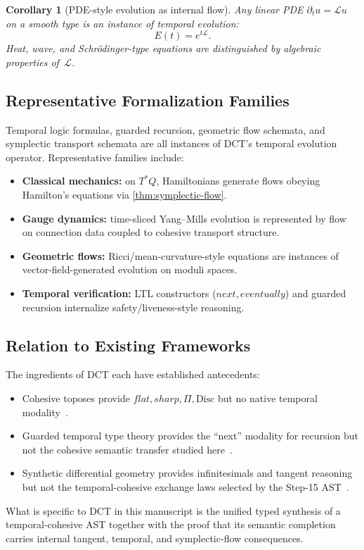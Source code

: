 \documentclass[11pt,a4paper]{article}
\def\flat{flat}%
\def\sharp{sharp}%
\def\bigcirc{next}%
\def\Diamond{eventually}%
\theoremstyle{plain}
\newtheorem{corollary}[theorem]{Corollary}
\theoremstyle{definition}
\theoremstyle{remark}
\newcommand{\Disc}{\mathrm{Disc}}
\begin{document}
\begin{corollary}[PDE-style evolution as internal flow]
Any linear PDE $\partial_t u = \mathcal{L}u$ on a smooth type is an instance of temporal evolution:
\[
E(t) = e^{t\mathcal{L}}.
\]
Heat, wave, and Schr\"odinger-type equations are distinguished by algebraic properties of~$\mathcal{L}$.
\end{corollary}

\subsection{Representative Formalization Families}

Temporal logic formulas, guarded recursion, geometric flow schemata, and symplectic transport schemata are all instances of DCT's temporal evolution operator.
Representative families include:
\begin{itemize}[nosep]
    \item \textbf{Classical mechanics:} on $T^*Q$, Hamiltonians generate flows obeying Hamilton's equations via \cref{thm:symplectic-flow}.
    \item \textbf{Gauge dynamics:} time-sliced Yang--Mills evolution is represented by flow on connection data coupled to cohesive transport structure.
    \item \textbf{Geometric flows:} Ricci/mean-curvature-style equations are instances of vector-field-generated evolution on moduli spaces.
    \item \textbf{Temporal verification:} LTL constructors ($\bigcirc,\Diamond$) and guarded recursion internalize safety/liveness-style reasoning.
\end{itemize}

\subsection{Relation to Existing Frameworks}

The ingredients of DCT each have established antecedents:
\begin{itemize}[nosep]
    \item Cohesive toposes provide $\flat,\sharp,\Pi,\Disc$ but no native temporal modality~\cite{lawvere,schreiber}.
    \item Guarded temporal type theory provides the ``next'' modality for recursion but not the cohesive semantic transfer studied here~\cite{nakano}.
    \item Synthetic differential geometry provides infinitesimals and tangent reasoning but not the temporal-cohesive exchange laws selected by the Step-15 AST~\cite{kock}.
\end{itemize}
What is specific to DCT in this manuscript is the unified typed synthesis of a temporal-cohesive AST together with the proof that its semantic completion carries internal tangent, temporal, and symplectic-flow consequences.
\end{document}

